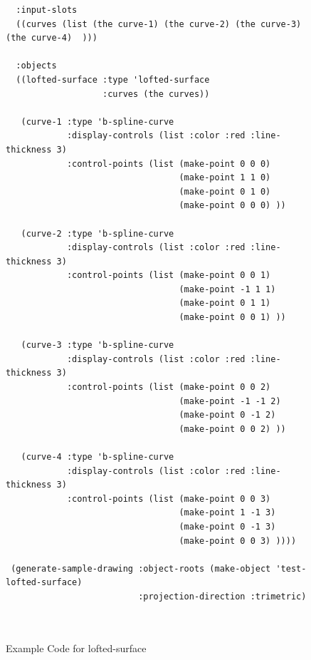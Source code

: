 \documentclass [11pt]{book}
\begin{document}
\begin{itemize}
\begin{figure}
\begin{lrbox}{\boxedverb}
\begin{minipage}{\linewidth}
{\begin{verbatim}
  :input-slots
  ((curves (list (the curve-1) (the curve-2) (the curve-3) (the curve-4)  )))
  
  :objects
  ((lofted-surface :type 'lofted-surface
                   :curves (the curves))
   
   (curve-1 :type 'b-spline-curve
            :display-controls (list :color :red :line-thickness 3)
            :control-points (list (make-point 0 0 0)
                                  (make-point 1 1 0)
                                  (make-point 0 1 0)
                                  (make-point 0 0 0) ))
   
   (curve-2 :type 'b-spline-curve
            :display-controls (list :color :red :line-thickness 3)
            :control-points (list (make-point 0 0 1)
                                  (make-point -1 1 1)
                                  (make-point 0 1 1)
                                  (make-point 0 0 1) ))
           
   (curve-3 :type 'b-spline-curve
            :display-controls (list :color :red :line-thickness 3)
            :control-points (list (make-point 0 0 2)
                                  (make-point -1 -1 2)
                                  (make-point 0 -1 2)
                                  (make-point 0 0 2) ))
   
   (curve-4 :type 'b-spline-curve
            :display-controls (list :color :red :line-thickness 3)
            :control-points (list (make-point 0 0 3)
                                  (make-point 1 -1 3)
                                  (make-point 0 -1 3)
                                  (make-point 0 0 3) ))))

 (generate-sample-drawing :object-roots (make-object 'test-lofted-surface)
                          :projection-direction :trimetric)

 
\end{verbatim}}
\end{minipage}
\end{lrbox}
\fbox{\usebox{\boxedverb}}

\caption{Example Code for lofted-surface}

\label{fig:example-code-lofted-surface}

\end{figure}


\end{itemize}
\end{document}
